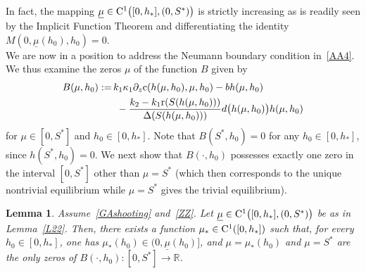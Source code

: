 \documentclass[reqno,11pt]{amsart}
\newtheorem{lem}[thm]{Lemma}
\numberwithin{equation}{section}
\newcommand{\R}{\mathbb{R}}
\begin{document}
In fact, the mapping $\underline{\mu}\in {\rm C}^1\big([0,h_*], (0,S^*)\big)$ is strictly increasing as is readily seen by the Implicit Function Theorem and differentiating the identity $M(0,\underline\mu(h_0),h_0)=0$.\\

We are now in a position to address the Neumann boundary condition in~\eqref{AA4}. We thus examine the zeros $\mu$ of the function $B$ given by
\begin{equation}\label{400}
\begin{split}
B(\mu,h_0):=\, & k_1\kappa_1 \partial_z {\rm c}(h(\mu,h_0),\mu,h_0)-bh(\mu,h_0)\\
&\ -\frac{k_2-k_1 {\rm r}(S(h(\mu,h_0)))}{\Delta(S(h(\mu,h_0)))}d\big(h(\mu,h_0)\big)h(\mu,h_0)
\end{split}
\end{equation}
for $\mu\in [0,S^*]$ and $h_0\in [0,h_*]$. Note that $B(S^*,h_0)=0$ for any $h_0\in [0,h_*]$, since $h(S^*,h_0)=0$. We next show that $B(\cdot,h_0)$ possesses exactly one zero in the interval $[0,S^*]$ other than  $\mu=S^*$  (which then corresponds to the unique nontrivial equilibrium while $\mu=S^*$ gives the trivial equilibrium).


\begin{lem}\label{L40}
Assume~\eqref{GAshooting} and~\eqref{ZZ}. Let  $\underline{\mu}\in {\rm C}^1\big([0,h_*], (0,S^*)\big)$ be as in Lemma~\ref{L22}. Then, there exists a function $\mu_*\in {\rm C}^1([0,h_*])$ such that, for every
$h_0\in[0,h_*]$, one has $\mu_*(h_0)\in(0,\underline{\mu}(h_0)]$, and
$\mu=\mu_*(h_0)$ and $\mu=S^*$ are the only zeros of
$B(\cdot,h_0):[0,S^*]\to\R$.
\end{lem}
\end{document}
